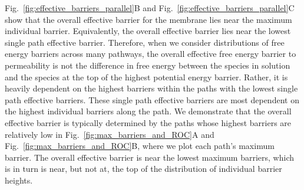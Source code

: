 \documentclass[12pt]{article}
\begin{document}
Fig.~\ref{fig:effective_barriers_parallel}B and Fig.~\ref{fig:effective_barriers_parallel}C show that the overall effective barrier for the membrane lies near the maximum individual barrier. Equivalently, the overall effective barrier lies near the lowest single path effective barrier. Therefore, when we consider distributions of free energy barriers across many pathways, the overall effective free energy barrier to permeability is not the difference in free energy between the species in solution and the species at the top of the highest potential energy barrier. Rather, it is heavily dependent on the highest barriers within the paths with the lowest single path effective barriers. These single path effective barriers are most dependent on the highest individual barriers along the path. We demonstrate that the overall effective barrier is typically determined by the paths whose highest barriers are relatively low in Fig.~\ref{fig:max_barriers_and_ROC}A and Fig.~\ref{fig:max_barriers_and_ROC}B, where we plot each path's maximum barrier. The overall effective barrier is near the lowest maximum barriers, which is in turn is near, but not at, the top of the distribution of individual barrier heights.
\end{document}
